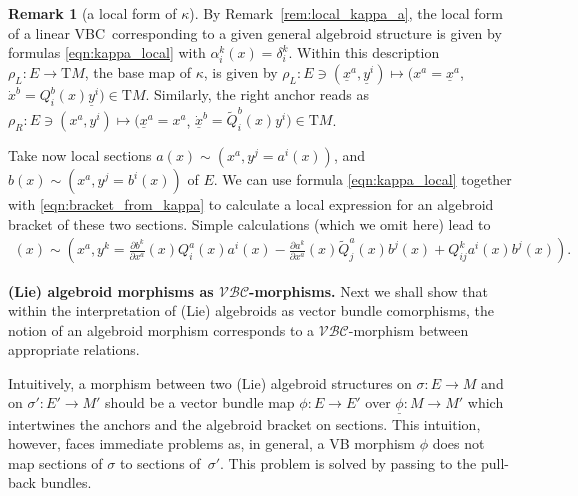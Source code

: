 \documentclass[pdftex]{sigma}
\newcommand{\ZM}{{VBC}} %
\newcommand{\Zakrzewski}{{vector bundle comorphism}}
\newcommand{\wt}[1]{\widetilde{#1}} %
\newcommand{\und}{\underline}
\newcommand{\pa}{\partial}
\newcommand{\ra}{\rightarrow}
\newcommand{\rhoL}{\rho_L} %
\newcommand{\rhoR}{\rho_R}
\newcommand{\T}{\mathrm{T}} %
\newcommand{\catZM}{{\mathcal{VBC}}} %
\numberwithin{equation}{section}
\theoremstyle{definition}
\newtheorem{rem}[thm]{Remark}
\begin{document}
\begin{rem}[a local form of $\kappa$] By Remark~\ref{rem:local_kappa_a}, the local form of a linear \ZM\ corresponding to a given general algebroid structure is given by formulas \eqref{eqn:kappa_local} with $\alpha^k_i(x) = \delta^k_i$. Within this description $\rhoL\colon E\ra \T M$, the base map of $\kappa$, is given by $\rhoL\colon E\ni(\und{x}^a,\und{y}^i)\longmapsto(x^a=\und{x}^a$, $\dot x^b=Q^b_i(x)\und{y}^i)\in\T M$. Similarly, the right anchor reads as $\rhoR\colon E\ni(x^a,y^i)\longmapsto(\und{x}^a=x^a$, $\dot{\und{x}}^b=\wt{Q}^b_i(x)y^i)\in\T M$.

Take now local sections $a(x)\sim(x^a,y^j=a^i(x))$, and $b(x)\sim(x^a,y^j=b^i(x))$ of $E$. We can use formula \eqref{eqn:kappa_local} together with \eqref{eqn:bracket_from_kappa} to calculate a local expression for an algebroid bracket of these two sections. Simple calculations (which we omit here) lead to
\begin{gather*} [a,b](x)\sim\left(x^a,y^k=\frac{\pa b^k}{\pa x^a}(x)Q^a_i(x)a^i(x)-\frac{\pa a^k}{\pa x^a}(x)\wt{Q}^a_j(x)b^j(x)+Q^k_{ij}a^i(x)b^j(x)\right).\end{gather*}
\end{rem}

{\bf (Lie) algebroid morphisms as $\boldsymbol{\catZM}$-morphisms.} Next we shall show that within the interpretation of (Lie) algebroids as \Zakrzewski s, the notion of an algebroid morphism corresponds to a $\catZM$-morphism between appropriate relations.

Intuitively, a morphism between two (Lie) algebroid structures on $\sigma\colon E\ra M$ and on \mbox{$\sigma'\colon E'\ra M'$} should be a vector bundle map $\phi\colon E\ra E'$ over $\und{\phi}\colon M\ra M'$ which intertwines the anchors and the algebroid bracket on sections. This intuition, however, faces immediate problems as, in general, a VB morphism $\phi$ does not map sections of $\sigma$ to sections of~$\sigma'$. This problem is solved by passing to the pull-back bundles.
\end{document}

